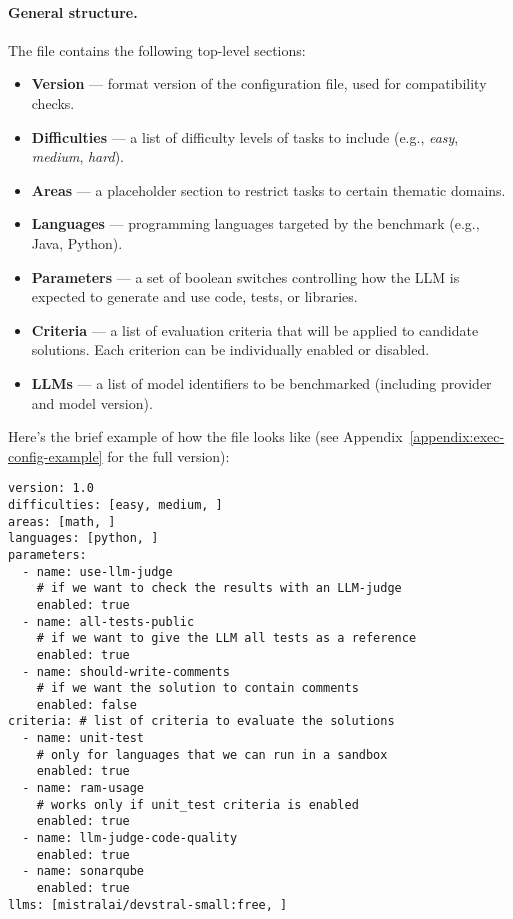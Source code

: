 \paragraph{General structure.}
The file contains the following top-level sections:

\begin{itemize}
    \item \textbf{Version} --- format version of the configuration file, used for compatibility checks.
    \item \textbf{Difficulties} --- a list of difficulty levels of tasks to include (e.g., \emph{easy}, \emph{medium}, \emph{hard}).
    \item \textbf{Areas} --- a placeholder section to restrict tasks to certain thematic domains.
    \item \textbf{Languages} --- programming languages targeted by the benchmark (e.g., Java, Python).
    \item \textbf{Parameters} --- a set of boolean switches controlling how the LLM is expected to generate and use code, tests, or libraries.
    \item \textbf{Criteria} --- a list of evaluation criteria that will be applied to candidate solutions. Each criterion can be individually enabled or disabled.
    \item \textbf{LLMs} --- a list of model identifiers to be benchmarked (including provider and model version).
\end{itemize}

Here's the brief example of how the file looks like (see Appendix~\ref{appendix:exec-config-example} for the full version):

\begin{verbatim}
version: 1.0
difficulties: [easy, medium, ]
areas: [math, ]
languages: [python, ]
parameters:
  - name: use-llm-judge
    # if we want to check the results with an LLM-judge
    enabled: true
  - name: all-tests-public
    # if we want to give the LLM all tests as a reference
    enabled: true
  - name: should-write-comments
    # if we want the solution to contain comments
    enabled: false
criteria: # list of criteria to evaluate the solutions
  - name: unit-test
    # only for languages that we can run in a sandbox
    enabled: true
  - name: ram-usage
    # works only if unit_test criteria is enabled
    enabled: true
  - name: llm-judge-code-quality
    enabled: true
  - name: sonarqube
    enabled: true
llms: [mistralai/devstral-small:free, ]
\end{verbatim}


